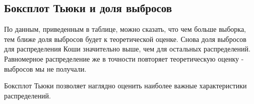 \subsection{Боксплот Тьюки и доля выбросов}
	По данным, приведенным в таблице, можно сказать, что чем больше выборка, тем ближе доля выбросов будет к теоретической оценке. Снова доля выбросов для распределения Коши значительно выше, чем для остальных распределений. Равномерное распределение же в точности повторяет теоретическую оценку - выбросов мы не получали.
	
	Боксплот Тьюки позволяет наглядно оценить наиболее важные характеристики распределений.